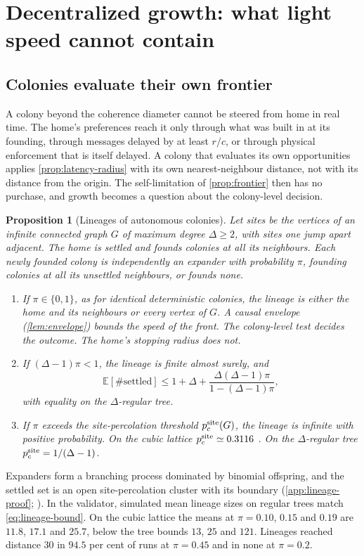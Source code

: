 \documentclass[11pt,a4paper]{article}
\newtheorem{proposition}{Proposition}
\theoremstyle{definition}
\begin{document}
\section{Decentralized growth: what light speed cannot contain}
\label{sec:decentral}
\subsection{Colonies evaluate their own frontier}
A colony beyond the coherence diameter cannot be steered from home in real
time. The home's preferences reach it only through what was built in at its
founding, through messages delayed by at least $r/c$, or through physical
enforcement that is itself delayed. A colony that evaluates its own
opportunities applies \cref{prop:latency-radius} with its own nearest-neighbour
distance, not with its distance from the origin. The self-limitation of
\cref{prop:frontier} then has no purchase, and growth becomes a question about
the colony-level decision.

\begin{proposition}[Lineages of autonomous colonies]
\label{prop:lineage}
Let sites be the vertices of an infinite connected graph $G$ of maximum degree
$\Delta\geq2$, with sites one jump apart adjacent. The home is settled and
founds colonies at all its neighbours. Each newly founded colony is
independently an \emph{expander} with probability $\pi$, founding colonies at
all its unsettled neighbours, or founds none.
\begin{enumerate}[label=(\roman*),leftmargin=*,nosep]
\item If $\pi\in\{0,1\}$, as for identical deterministic colonies, the lineage
is either the home and its neighbours or every vertex of $G$. A causal envelope
(\cref{lem:envelope}) bounds the speed of the front. The colony-level test
decides the outcome. The home's stopping radius does not.
\item If $(\Delta-1)\pi<1$, the lineage is finite almost surely, and
\begin{equation}
 \mathbb E[\#\text{settled}]\leq1+\Delta+\frac{\Delta(\Delta-1)\pi}{1-(\Delta-1)\pi},
 \label{eq:lineage-bound}
\end{equation}
with equality on the $\Delta$-regular tree.
\item If $\pi$ exceeds the site-percolation threshold $p_c^{\rm site}(G)$, the
lineage is infinite with positive probability. On the cubic lattice
$p_c^{\rm site}\simeq0.3116$ \citep{DengBlote2005}. On the $\Delta$-regular tree
$p_c^{\rm site}=1/(\Delta-1)$.
\end{enumerate}
\end{proposition}
\noindent Expanders form a branching process dominated by binomial offspring,
and the settled set is an open site-percolation cluster with its boundary
(\cref{app:lineage-proof}; \citealp{Grimmett1999}). In the validator, simulated
mean lineage sizes on regular trees match \cref{eq:lineage-bound}. On the cubic
lattice the means at $\pi=0.10$, $0.15$ and $0.19$ are $11.8$, $17.1$ and
$25.7$, below the tree bounds $13$, $25$ and $121$. Lineages reached distance 30
in $94.5$ per cent of runs at $\pi=0.45$ and in none at $\pi=0.2$.
\end{document}
